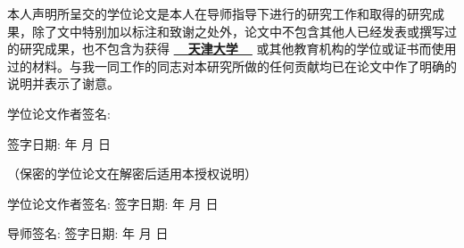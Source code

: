 \pagestyle{empty}


\newpage
\vspace*{1cm}
\renewcommand{\baselinestretch}{1} %
\begin{center}\songti{}\end{center}\par
\vspace*{0.5cm}
{本人声明所呈交的学位论文是本人在导师指导下进行的研究工作和取得的研究成果，除了文中特别加以标注和致谢之处外，论文中不包含其他人已经发表或撰写过的研究成果，也不包含为获得 {\underline{\kaishu{}\bfseries{~~天津大学~~}}} 或其他教育机构的学位或证书而使用过的材料。与我一同工作的同志对本研究所做的任何贡献均已在论文中作了明确的说明并表示了谢意。}\par
\vspace*{1cm}
\begin{multicols}{2}
	\noindent 学位论文作者签名:  
	
	\noindent 签字日期: \makebox[1.5cm][s]{} 年 \makebox[0.5cm][s]{} 月 \makebox[0.5cm][s]{} 日 
\end{multicols}
\vspace*{3cm}
\begin{center}\songti{}\end{center}\par
\vspace*{1cm}

\begin{center}（保密的学位论文在解密后适用本授权说明）\end{center}


\vspace*{1cm}
\begin{multicols}{2}       %
	\noindent 学位论文作者签名:  
	\newline\newline
	\noindent 签字日期: \makebox[1.5cm][s]{} 年 \makebox[0.7cm][s]{} 月 \makebox[0.7cm][s]{} 日 
	
	\noindent 导师签名:  
	\newline\newline
	\noindent 签字日期: \makebox[1.5cm][s]{} 年 \makebox[0.7cm][s]{} 月 \makebox[0.7cm][s]{} 日 
	
\end{multicols}

